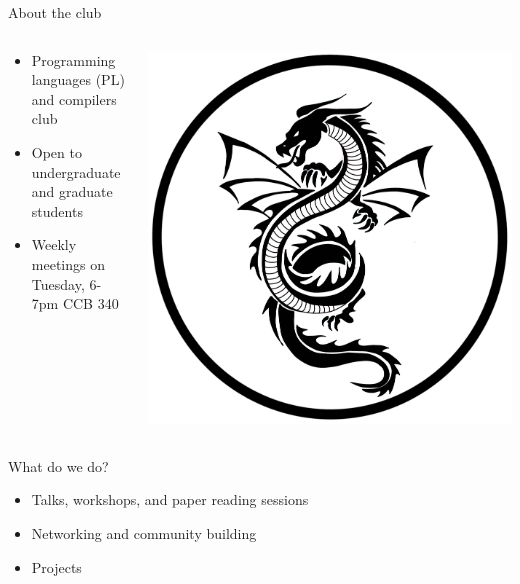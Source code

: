 \documentclass{beamer}
\begin{document}
\begin{frame}{About the club}
  \begin{columns}
    \begin{column}{0.8\textwidth}
      \begin{itemize}
      \item Programming languages (PL) and compilers club
      \item Open to undergraduate and graduate students
      \item Weekly meetings on Tuesday, 6-7pm CCB 340
      \end{itemize}
    \end{column}

    \begin{column}{0.15\textwidth}
      \centering
      \includegraphics[width=\textwidth]{assets/dragon.png}
    \end{column}
  \end{columns}
\end{frame}

\begin{frame}{What do we do?}
  \begin{itemize}
  \item Talks, workshops, and paper reading sessions
  \item Networking and community building
  \item Projects
  \end{itemize}
\end{frame}
\end{document}
